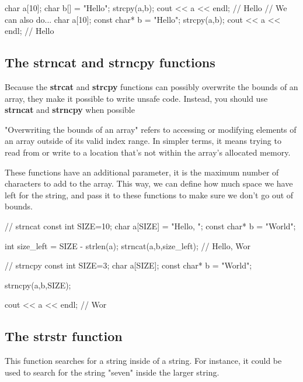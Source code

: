 \documentclass{report}
\begin{document}
    \begin{cppcode}
char a[10];
char b[] = "Hello";
strcpy(a,b);
cout << a << endl; // Hello
// We can also do...
char a[10];
const char* b = "Hello";
strcpy(a,b);
cout << a << endl; // Hello
    \end{cppcode}
    
    \bigbreak \noindent 
    \bigbreak \noindent 

    \pagebreak
    \subsection{The strncat and strncpy functions}
    \bigbreak \noindent 
    Because the \textbf{strcat} and \textbf{strcpy} functions can possibly overwrite the bounds of an array, they make it possible to write unsafe code. Instead, you should use \textbf{strncat} and \textbf{strncpy} when possible
    \bigbreak \noindent 
    \begin{remark}
       "Overwriting the bounds of an array" refers to accessing or modifying elements of an array outside of its valid index range. In simpler terms, it means trying to read from or write to a location that's not within the array's allocated memory.
    \end{remark}
    \bigbreak \noindent 
    These functions have an additional parameter, it is the maximum number of characters to add to the array. This way, we can define how much space we have left for the string, and pass it to these functions to make sure we don't go out of bounds.
    \bigbreak \noindent 
    
    \begin{cppcode}
// strncat
const int SIZE=10;
char a[SIZE] = "Hello, ";
const char* b = "World";

int size_left = SIZE - strlen(a);
strncat(a,b,size_left); // Hello, Wor

// strncpy
const int SIZE=3;
char a[SIZE];
const char* b = "World";

strncpy(a,b,SIZE);

cout << a << endl; // Wor
    \end{cppcode}
    

    \bigbreak \noindent 
    \subsection{The strstr function}
    \bigbreak \noindent 
    This function searches for a string inside of a string. For instance, it could be used to search for the string "seven" inside the larger string.
    \bigbreak \noindent 
    
\end{document}
